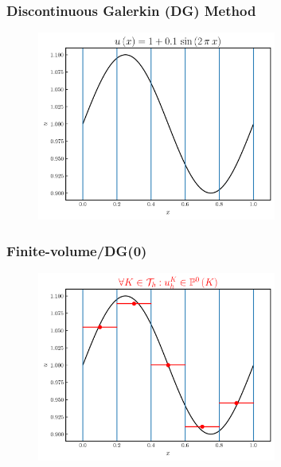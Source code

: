 \documentclass{beamer}
\begin{document}
\begin{frame}
\frametitle{Discontinuous Galerkin (DG) Method}

  \begin{figure}[htb!]
    \centering
    \includegraphics[width=0.7\textwidth]{fig.sine.png}
  \end{figure}

\end{frame}

\begin{frame}
\frametitle{Finite-volume/DG(0)}

  \begin{figure}[htb!]
    \centering
    \includegraphics[width=0.7\textwidth]{fig.sine_k0.png}
  \end{figure}

\end{frame}
\end{document}
